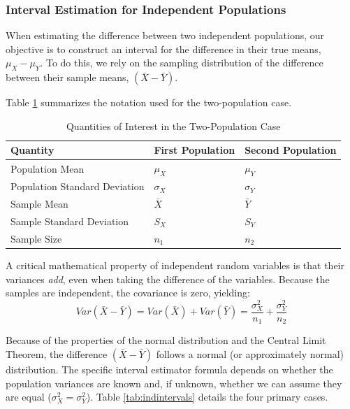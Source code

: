 \documentclass{article}
\begin{document}
\subsubsection{Interval Estimation for Independent Populations}

When estimating the difference between two independent populations, our objective is to construct an interval for the difference in their true means, $\mu_X - \mu_Y$. To do this, we rely on the sampling distribution of the difference between their sample means, $(\bar{X} - \bar{Y})$.

Table \ref{tab:quantities} summarizes the notation used for the two-population case.

\begin{table}[htbp]
\centering
\begin{tabular}{lll}
\hline
\textbf{Quantity}             & \textbf{First Population} & \textbf{Second Population} \\ \hline
Population Mean               & $\mu_X$ & $\mu_Y$ \\
Population Standard Deviation & $\sigma_X$ & $\sigma_Y$ \\
Sample Mean                   & $\bar{X}$ & $\bar{Y}$ \\
Sample Standard Deviation     & $S_X$ &  $S_Y$ \\
Sample Size                   & $n_1$ & $n_2$ \\ \hline \hline
\end{tabular}
\caption{\label{tab:quantities} Quantities of Interest in the Two-Population Case}
\end{table}

A critical mathematical property of independent random variables is that their variances \emph{add}, even when taking the difference of the variables. Because the samples are independent, the covariance is zero, yielding:
$$ Var(\bar{X} - \bar{Y}) = Var(\bar{X}) + Var(\bar{Y}) = \frac{\sigma^2_X}{n_1} + \frac{\sigma^2_Y}{n_2} $$

Because of the properties of the normal distribution and the Central Limit Theorem, the difference $(\bar{X} - \bar{Y})$ follows a normal (or approximately normal) distribution. The specific interval estimator formula depends on whether the population variances are known and, if unknown, whether we can assume they are equal ($\sigma^2_X = \sigma^2_Y$). Table \ref{tab:indintervals} details the four primary cases.
\end{document}
